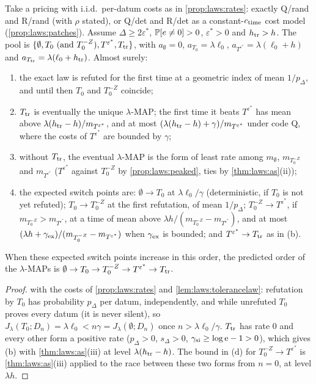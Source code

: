 \begin{corollary}\label{cor:laws:phases}
Take a pricing with i.i.d.\ per-datum costs as in \cref{prop:laws:rates}: exactly Q/rand and R/rand (with $\rho$ stated), or Q/det and R/det as a constant-$c_{\rm time}$ cost model (\cref{prop:laws:patches}). Assume $\Delta\ge2\varepsilon^*$, $\mathbb{P}[e\ne0]>0$, $\varepsilon^*>0$ and $h_{\rm tr}>h$. The pool is $\{\emptyset,T_0\text{ (and }T_0^{-Z}),T^{\varepsilon^*},T_{\rm tr}\}$, with $a_\emptyset=0$, $a_{T_0}=\lambda\ell_0$, $a_{T^{\varepsilon^*}}=\lambda(\ell_0+h)$ and $a_{T_{\rm tr}}=\lambda(\ell_0+h_{\rm tr})$. Almost surely:
\begin{enumerate}[label=(\alph*),itemsep=1pt,topsep=2pt]
\item the exact law is refuted for the first time at a geometric index of mean $1/p_\Delta$, and until then $T_0$ and $T_0^{-Z}$ coincide;
\item $T_{\rm tr}$ is eventually the unique $\lambda$-MAP; the first time it beats $T^{\varepsilon^*}$ has mean above $\lambda(h_{\rm tr}-h)/m_{T^{\varepsilon^*}}$, and at most $(\lambda(h_{\rm tr}-h)+\gamma)/m_{T^{\varepsilon^*}}$ under code Q, where the costs of $T^{\varepsilon^*}$ are bounded by $\gamma$;
\item without $T_{\rm tr}$, the eventual $\lambda$-MAP is the form of least rate among $m_\emptyset$, $m_{T_0^{-Z}}$ and $m_{T^{\varepsilon^*}}$ ($T^{\varepsilon^*}$ against $T_0^{-Z}$ by \cref{prop:laws:peaked}, ties by \cref{thm:laws:as}(ii));
\item the expected switch points are: $\emptyset\to T_0$ at $\lambda\ell_0/\gamma$ (deterministic, if $T_0$ is not yet refuted); $T_0\to T_0^{-Z}$ at the first refutation, of mean $1/p_\Delta$; $T_0^{-Z}\to T^{\varepsilon^*}$, if $m_{T_0^{-Z}}>m_{T^{\varepsilon^*}}$, at a time of mean above $\lambda h/(m_{T_0^{-Z}}-m_{T^{\varepsilon^*}})$, and at most $(\lambda h+\gamma_{\rm ex})/(m_{T_0^{-Z}}-m_{T^{\varepsilon^*}})$ when $\gamma_{\rm ex}$ is bounded; and $T^{\varepsilon^*}\to T_{\rm tr}$ as in (b).
\end{enumerate}
When these expected switch points increase in this order, the predicted order of the $\lambda$-MAPs is $\emptyset\to T_0\to T_0^{-Z}\to T^{\varepsilon^*}\to T_{\rm tr}$.
\end{corollary}

\begin{proof}
 with the costs of \cref{prop:laws:rates} and \cref{lem:laws:tolerancelaw}: refutation by $T_0$ has probability $p_\Delta$ per datum, independently, and while unrefuted $T_0$ proves every datum (it is never silent), so $J_\lambda(T_0;D_n)=\lambda\ell_0<n\gamma=J_\lambda(\emptyset;D_n)$ once $n>\lambda\ell_0/\gamma$. $T_{\rm tr}$ has rate $0$ and every other form a positive rate ($p_\Delta>0$, $s_\Delta>0$, $\gamma_{\rm si}\ge\log\mathrm e-1>0$), which gives (b) with \cref{thm:laws:as}(iii) at level $\lambda(h_{\rm tr}-h)$. The bound in (d) for $T_0^{-Z}\to T^{\varepsilon^*}$ is \cref{thm:laws:as}(iii) applied to the race between these two forms from $n=0$, at level $\lambda h$.
\end{proof}

